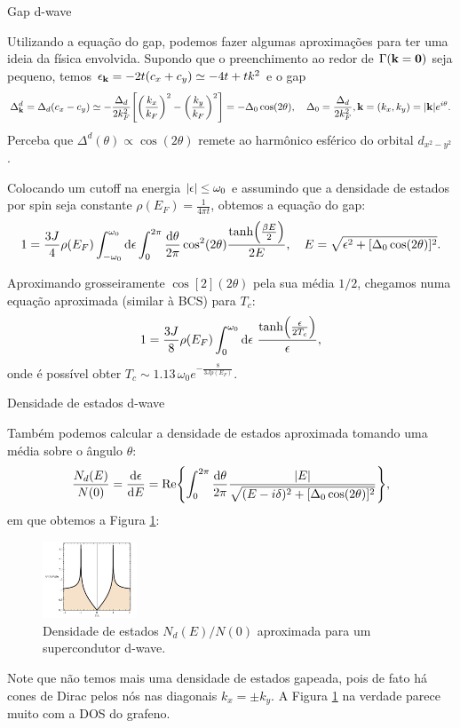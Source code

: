 \documentclass[8pt,aspectratio=169,xcolor={table,dvipsnames,usenames}]{beamer}
\begin{document}
\begin{frame}{Gap d-wave}

Utilizando a equação do gap, podemos fazer algumas aproximações para ter uma ideia da física envolvida. Supondo que o preenchimento ao redor de $\Gamma (\vb{k} = \vb{0})$ seja pequeno, temos $\epsilon_{\vb{k}} = -2t (c_x + c_y) \simeq -4t  + t k^2$ e o gap
$$
\Delta_{\vb{k}}^d = \Delta_d (c_x - c_y) \simeq -\frac{\Delta_d}{2 k_F^2}
\qty[\qty(\frac{k_x}{k_F})^2 - \qty(\frac{k_y}{k_F})^2] = - \Delta_0 \cos(2\theta),
\quad \Delta_0 = \frac{\Delta_d}{2 k_F^2}, \vb{k} = (k_x, k_y) = \abs{\vb{k}} e^{i\theta}.
$$
Perceba que $\Delta^d(\theta) \propto \cos(2\theta)$ remete ao harmônico esférico do orbital $d_{x^2 - y^2}$.

\n

Colocando um cutoff na energia $\abs{\epsilon} \leq \omega_0$ e assumindo que a densidade de estados por spin seja constante $\rho(E_F) = \frac{1}{4\pi t}$, obtemos a equação do gap:
$$
1 = \frac{3 J}{4} \rho(E_F) \int_{-\omega_0}^{\omega_0} \dd{\epsilon}
\int_0^{2\pi} \frac{\dd{\theta}}{2\pi} \cos[2](2\theta) \frac{\tanh(\frac{\beta E}{2})}{2E}, \quad E = \sqrt{\epsilon^2 + [\Delta_0 \cos(2\theta)]^2}.
$$

Aproximando grosseiramente $\cos[2](2\theta)$ pela sua média $1/2$, chegamos numa equação aproximada (similar à BCS) para $T_c$:
$$
1 = \frac{3J}{8} \rho(E_F) \int_0^{\omega_0} \dd{\epsilon} \,
\frac{\tanh(\frac{\epsilon}{2T_c})}{\epsilon},
$$
onde é possível obter $T_c \sim 1.13 \, \omega_0 e^{-\frac{8}{3 J \rho(E_F)}}$.


\end{frame}


\begin{frame}{Densidade de estados d-wave}

Também podemos calcular a densidade de estados aproximada tomando uma média sobre o ângulo $\theta$:
$$
\frac{N_d(E)}{N(0)} = \dv{\epsilon}{E} =
\Re{\int_0^{2\pi} \frac{\dd{\theta}}{2\pi}
\frac{\abs{E}}{\sqrt{(E - i\delta)^2 + [\Delta_0 \cos(2\theta)]^2}}
},
$$
em que obtemos a Figura \ref{fig:dwavedos}:

\begin{figure}[H]
\centering
\includegraphics[width=0.25\textwidth]{fig/dwavedos.png}
\caption{Densidade de estados $N_d(E)/N(0)$ aproximada para um supercondutor d-wave.}
\label{fig:dwavedos}
\end{figure}

Note que não temos mais uma densidade de estados gapeada, pois de fato há cones de Dirac pelos nós nas diagonais $k_x = \pm k_y$. A Figura \ref{fig:dwavedos} na verdade parece muito com a DOS do grafeno.

\end{frame}
\end{document}
